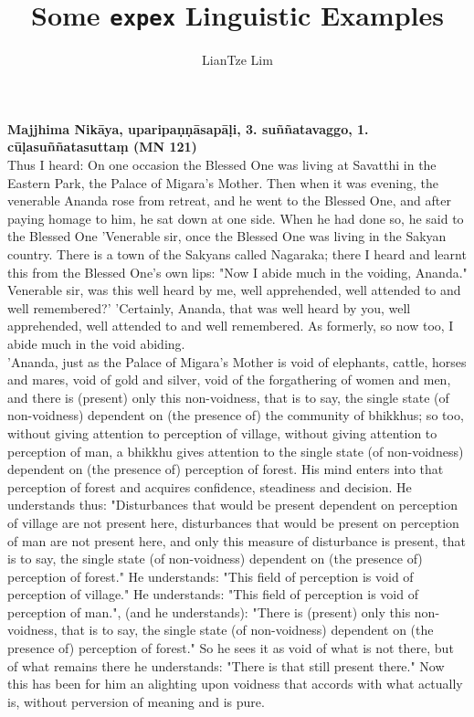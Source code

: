 \documentclass[11pt]{article}
\title{Some \texttt{expex} Linguistic Examples}
\author{LianTze Lim}
\begin{document}
\textbf{Majjhima Nikāya, uparipaṇṇāsapāḷi, 3. suññatavaggo, 1. cūḷasuññatasuttaṃ (MN 121)}\\[.3cm]

Thus I heard: On one occasion the Blessed One was living at Savatthi in the Eastern Park, the Palace of Migara's Mother. Then when it was evening, the venerable Ananda rose from retreat, and he went to the Blessed One, and after paying homage to him, he sat down at one side. When he had done so, he said to the Blessed One 'Venerable sir, once the Blessed One was living in the Sakyan country. There is a town of the Sakyans called Nagaraka; there I heard and learnt this from the Blessed One's own lips: "Now I abide much in the voiding, Ananda." Venerable sir, was this well heard by me, well apprehended, well attended to and well remembered?' 'Certainly, Ananda, that was well heard by you, well apprehended, well attended to and well remembered. As formerly, so now too, I abide much in the void abiding.\\

 'Ananda, just as the Palace of Migara's Mother is void of elephants, cattle, horses and mares, void of gold and silver, void of the forgathering of women and men, and there is (present) only this non-voidness, that is to say, the single state (of non-voidness) dependent on (the presence of) the community of bhikkhus; so too, without giving attention to perception of village, without giving attention to perception of man, a bhikkhu gives attention to the single state (of non-voidness) dependent on (the presence of) perception of forest. His mind enters into that perception of forest and acquires confidence, steadiness and decision. He understands thus: "Disturbances that would be present dependent on perception of village are not present here, disturbances that would be present on perception of man are not present here, and only this measure of disturbance is present, that is to say, the single state (of non-voidness) dependent on (the presence of) perception of forest." He understands: "This field of perception is void of perception of village." He understands: "This field of perception is void of perception of man.", (and he understands): "There is (present) only this non-voidness, that is to say, the single state (of non-voidness) dependent on (the presence of) perception of forest." So he sees it as void of what is not there, but of what remains there he understands: "There is that still present there." Now this has been for him an alighting upon voidness that accords with what actually is, without perversion of meaning and is pure.\\
\end{document}
